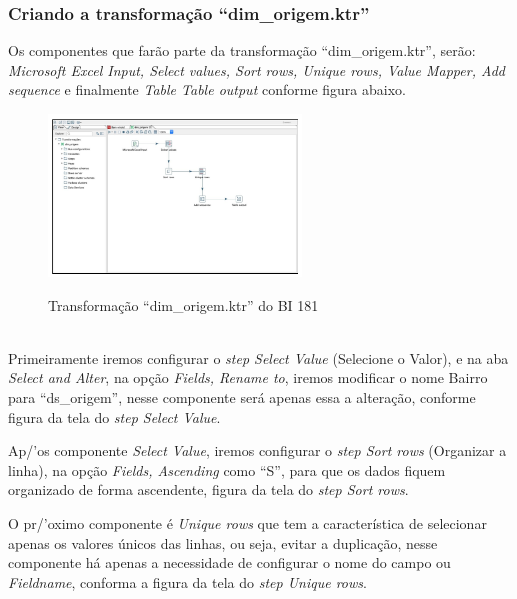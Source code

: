 \subsubsection{Criando a transforma\c{c}\~{a}o ``dim\_origem.ktr''}

Os componentes que far\~{a}o parte da transforma\c{c}\~{a}o ``dim\_origem.ktr'', ser\~{a}o: \textit{Microsoft Excel Input, Select values, Sort rows, Unique rows, Value Mapper, Add sequence} e finalmente \textit{Table Table output} conforme figura abaixo. 

\begin{figure}[H]
	\vspace*{0,2cm}
    \centering
    \caption{Transforma\c{c}\~{a}o ``dim\_origem.ktr'' do BI 181}
    \includegraphics[width=0.6\textwidth]{./04-figuras/figura-dim-origem}
    \label{fig:ilustfigrdimorigem}
\end{figure}
\vspace*{-0,9cm}
{\raggedright {}} \\

Primeiramente iremos configurar o \textit{step Select Value} (Selecione o Valor), e na aba \textit{Select and Alter}, na op\c{c}\~{a}o \textit{Fields, Rename to}, iremos modificar o nome Bairro para ``ds\_origem'', nesse componente ser\'{a} apenas essa a altera\c{c}\~{a}o, conforme figura da tela do \textit{step Select Value}.

Ap/'{o}s componente \textit{Select Value}, iremos configurar o \textit{step Sort rows} (Organizar a linha), na op\c{c}\~{a}o \textit{Fields, Ascending} como ``S'', para que os dados fiquem organizado de forma ascendente, figura da tela do \textit{step Sort rows}.

O pr/'{o}ximo componente \'{e} \textit{Unique rows} que tem a caracter\'{i}stica de selecionar apenas os valores únicos das linhas, ou seja, evitar a duplica\c{c}\~{a}o, nesse componente h\'{a} apenas a necessidade de configurar o nome do campo ou \textit{Fieldname}, conforma a figura da tela do \textit{step Unique rows}.


